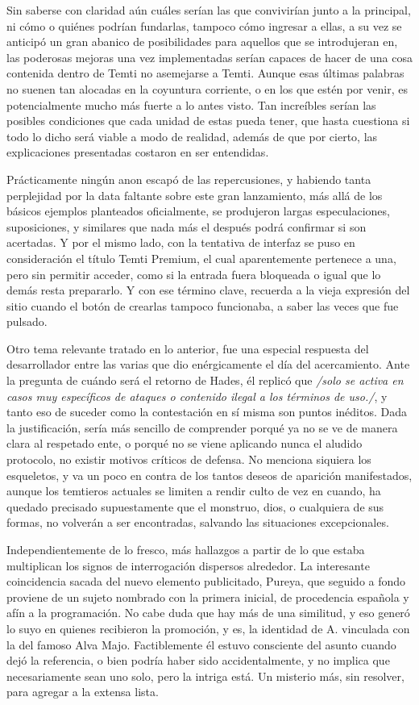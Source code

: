 \documentclass[
]{book}
\begin{document}
Sin saberse con claridad aún cuáles serían las que convivirían junto a la principal, ni cómo o quiénes podrían fundarlas, tampoco cómo ingresar a ellas, a su vez se anticipó un gran abanico de posibilidades para aquellos que se introdujeran en, las poderosas mejoras una vez implementadas serían capaces de hacer de una cosa contenida dentro de Temti no asemejarse a Temti. Aunque esas últimas palabras no suenen tan alocadas en la coyuntura corriente, o en los que estén por venir, es potencialmente mucho más fuerte a lo antes visto. Tan increíbles serían las posibles condiciones que cada unidad de estas pueda tener, que hasta cuestiona si todo lo dicho será viable a modo de realidad, además de que por cierto, las explicaciones presentadas costaron en ser entendidas.

Prácticamente ningún anon escapó de las repercusiones, y habiendo tanta perplejidad por la data faltante sobre este gran lanzamiento, más allá de los básicos ejemplos planteados oficialmente, se produjeron largas especulaciones, suposiciones, y similares que nada más el después podrá confirmar si son acertadas. Y por el mismo lado, con la tentativa de interfaz se puso en consideración el título Temti Premium, el cual aparentemente pertenece a una, pero sin permitir acceder, como si la entrada fuera bloqueada o igual que lo demás resta prepararlo. Y con ese término clave, recuerda a la vieja expresión del sitio cuando el botón de crearlas tampoco funcionaba, a saber las veces que fue pulsado.

Otro tema relevante tratado en lo anterior, fue una especial respuesta del desarrollador entre las varias que dio enérgicamente el día del acercamiento. Ante la pregunta de cuándo será el retorno de Hades, él replicó que \emph{/solo se activa en casos muy específicos de ataques o contenido ilegal a los términos de uso./}, y tanto eso de suceder como la contestación en sí misma son puntos inéditos. Dada la justificación, sería más sencillo de comprender porqué ya no se ve de manera clara al respetado ente, o porqué no se viene aplicando nunca el aludido protocolo, no existir motivos críticos de defensa. No menciona siquiera los esqueletos, y va un poco en contra de los tantos deseos de aparición manifestados, aunque los temtieros actuales se limiten a rendir culto de vez en cuando, ha quedado precisado supuestamente que el monstruo, dios, o cualquiera de sus formas, no volverán a ser encontradas, salvando las situaciones excepcionales.

Independientemente de lo fresco, más hallazgos a partir de lo que estaba multiplican los signos de interrogación dispersos alrededor. La interesante coincidencia sacada del nuevo elemento publicitado, Pureya, que seguido a fondo proviene de un sujeto nombrado con la primera inicial, de procedencia española y afín a la programación. No cabe duda que hay más de una similitud, y eso generó lo suyo en quienes recibieron la promoción, y es, la identidad de A. vinculada con la del famoso Alva Majo. Factiblemente él estuvo consciente del asunto cuando dejó la referencia, o bien podría haber sido accidentalmente, y no implica que necesariamente sean uno solo, pero la intriga está. Un misterio más, sin resolver, para agregar a la extensa lista.
\end{document}
